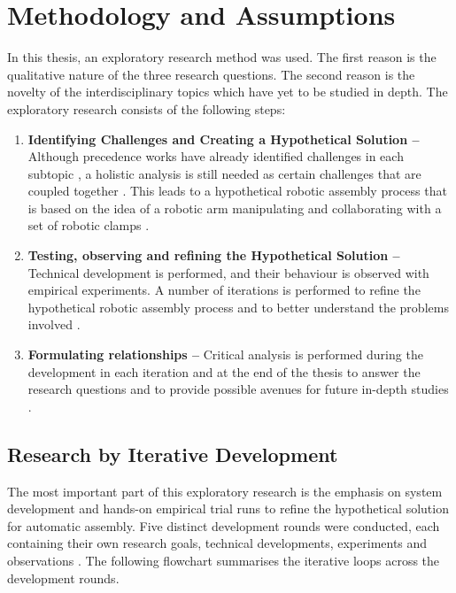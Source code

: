 \chapter{Methodology and Assumptions}
\label{chapter:methodology-and-assumptions}

In this thesis, an exploratory research method was used. The first reason is the qualitative nature of the three research questions. The second reason is the novelty of the interdisciplinary topics which have yet to be studied in depth. The exploratory research consists of the following steps:

\begin{enumerate}
	\item \textbf{Identifying Challenges and Creating a Hypothetical Solution --} Although precedence works have already identified challenges in each subtopic , a holistic analysis is still needed as certain challenges that are coupled together . This leads to a hypothetical robotic assembly process that is based on the idea of a robotic arm manipulating and collaborating with a set of robotic clamps .

	\item \textbf{Testing, observing and refining the Hypothetical Solution --} Technical development is performed, and their behaviour is observed with empirical experiments. A number of iterations is performed to refine the hypothetical robotic assembly process and to better understand the problems involved .

	\item \textbf{Formulating relationships --} Critical analysis is performed during the development in each iteration and at the end of the thesis to answer the research questions and to provide possible avenues for future in-depth studies .

\end{enumerate}
\section{Research by Iterative Development}
\label{section:methodology-research-by-iterative-development}

The most important part of this exploratory research is the emphasis on system development and hands-on empirical trial runs to refine the hypothetical solution for automatic assembly. Five distinct development rounds were conducted, each containing their own research goals, technical developments, experiments and observations . The following flowchart summarises the iterative loops across the development rounds. 

